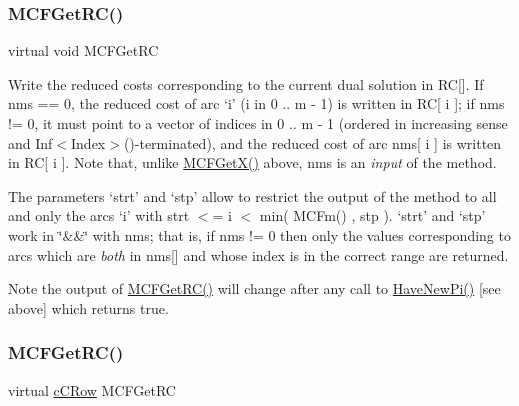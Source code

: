 \subsubsection{\texorpdfstring{M\+C\+F\+Get\+R\+C()}{MCFGetRC()}\hspace{0.1cm}{\footnotesize\ttfamily [2/5]}}
{\footnotesize\ttfamily virtual void M\+C\+F\+Get\+RC}

Write the reduced costs corresponding to the current dual solution in RC\mbox{[}\mbox{]}. If nms == 0, the reduced cost of arc `i' (i in 0 .. m -\/ 1) is written in RC\mbox{[} i \mbox{]}; if nms != 0, it must point to a vector of indices in 0 .. m -\/ 1 (ordered in increasing sense and Inf$<$\+Index$>$()-\/terminated), and the reduced cost of arc nms\mbox{[} i \mbox{]} is written in RC\mbox{[} i \mbox{]}. Note that, unlike \mbox{\hyperlink{class_m_c_f_class_a4eb307e0707adaef99bb0e08c9e10eb8}{M\+C\+F\+Get\+X()}} above, nms is an {\itshape input} of the method.

The parameters `strt' and `stp' allow to restrict the output of the method to all and only the arcs `i' with strt $<$= i $<$ min( M\+C\+Fm() , stp ). `strt' and `stp' work in \char`\"{}\&\&\char`\"{} with nms; that is, if nms != 0 then only the values corresponding to arcs which are {\itshape both} in nms\mbox{[}\mbox{]} and whose index is in the correct range are returned.

\begin{DoxyNote}{Note}
the output of \mbox{\hyperlink{class_m_c_f_class_af027cee8179a876a4879c73820c380d1}{M\+C\+F\+Get\+R\+C()}} will change after any call to \mbox{\hyperlink{class_m_c_f_class_a87b2b6516a7874ac55145312bd2d55bb}{Have\+New\+Pi()}} \mbox{[}see above\mbox{]} which returns true. 
\end{DoxyNote}
\mbox{\label{class_m_c_f_simplex_af027cee8179a876a4879c73820c380d1}} 
\subsubsection{\texorpdfstring{M\+C\+F\+Get\+R\+C()}{MCFGetRC()}\hspace{0.1cm}{\footnotesize\ttfamily [3/5]}}
{\footnotesize\ttfamily virtual \mbox{\hyperlink{class_m_c_f_class_ab700102e9ba8bb6015be6818d4e99097}{c\+C\+Row}} M\+C\+F\+Get\+RC\hspace{0.3cm}{\ttfamily [inline]}}

